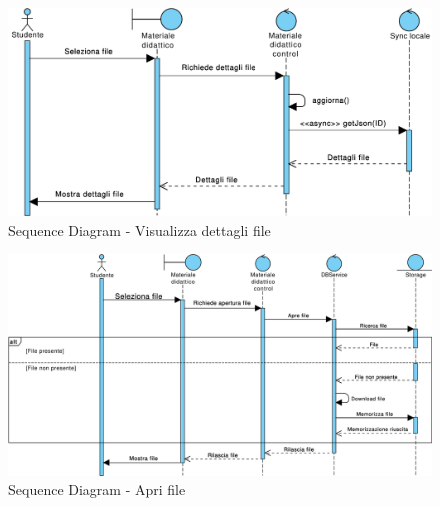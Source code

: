 \begin{figure}
	\centering
	\includegraphics[width=6.5in]{imgs/gruppo1//sequence_diagrams/SD15_visualizza_dettagli_file.pdf}
	\caption{Sequence Diagram - Visualizza dettagli file}
	\label{diag:visualizzaDettagliFileSD}
\end{figure}

\begin{figure}
	\centering
	\includegraphics[width=6.5in]{imgs/gruppo1/sequence_diagrams/SD16_apri_file.pdf}
	\caption{Sequence Diagram - Apri file}
	\label{diag:apriFileSD}
\end{figure}
\newpage

